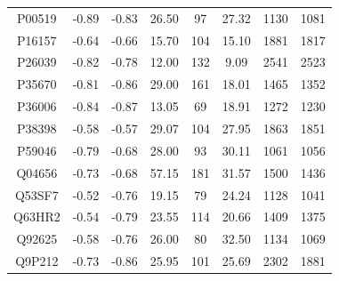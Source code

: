 \begin{table}
\begin{tabular}{@{}cccccccc@{}}
P00519 & -0.89 & -0.83 & 26.50 & 97  & 27.32 & 1130 & 1081 \\
P16157 & -0.64 & -0.66 & 15.70 & 104 & 15.10 & 1881 & 1817 \\
P26039 & -0.82 & -0.78 & 12.00 & 132 & 9.09  & 2541 & 2523 \\
P35670 & -0.81 & -0.86 & 29.00 & 161 & 18.01 & 1465 & 1352 \\
P36006 & -0.84 & -0.87 & 13.05 & 69  & 18.91 & 1272 & 1230 \\
P38398 & -0.58 & -0.57 & 29.07 & 104 & 27.95 & 1863 & 1851 \\
P59046 & -0.79 & -0.68 & 28.00 & 93  & 30.11 & 1061 & 1056 \\
Q04656 & -0.73 & -0.68 & 57.15 & 181 & 31.57 & 1500 & 1436 \\
Q53SF7 & -0.52 & -0.76 & 19.15 & 79  & 24.24 & 1128 & 1041 \\
Q63HR2 & -0.54 & -0.79 & 23.55 & 114 & 20.66 & 1409 & 1375 \\
Q92625 & -0.58 & -0.76 & 26.00 & 80  & 32.50 & 1134 & 1069 \\
Q9P212 & -0.73 & -0.86 & 25.95 & 101 & 25.69 & 2302 & 1881 \\ \bottomrule
\end{tabular}
\end{table}